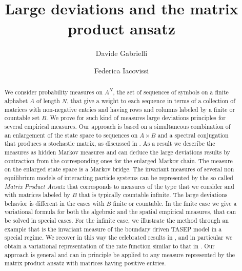 \documentclass[reqno]{amsart}
\theoremstyle{plain}
\theoremstyle{definition}
\theoremstyle{remark}
\numberwithin{equation}{section}
\numberwithin{theorem}{section}
\newcommand{\<}{\langle}
\renewcommand{\>}{\rangle}
\begin{document}
	
	\title[LD and MPA]{Large deviations and the matrix product ansatz}
	
	
	
	
	
	
	
	\author{Davide Gabrielli}
	\address{\noindent Davide Gabrielli \hfill\break\indent 
		DISIM, Universit\`a dell'Aquila
		\hfill\break{} Coppito, L'Aquila, Italy
	}
	
	
	\author{Federica Iacovissi}
	\address{\noindent Federica Iacovissi \hfill\break\indent 
		DISIM, Universit\`a dell'Aquila
		\hfill\break{} Coppito, L'Aquila, Italy
	}
	
	
	
	
	
	
	
	
	
	
	\begin{abstract}
		We consider probability measures on $A^N$, the set of sequences of symbols on a finite alphabet $A$ of length $N$, that give a weight to each sequence in terms of a collection of matrices with non-negative entries and having rows and columns labeled by a finite or countable set $B$. We prove for such kind of measures large deviations principles for several empirical measures. Our approach is based on a simultaneous combination of an enlargement of the state space to sequences on $A\times B$ and a spectral conjugation that produces a stochastic matrix, as discussed in \cite{GI1}. As a result we describe the measures as hidden Markov measures and can deduce the large deviations results by contraction from the corresponding ones for the enlarged Markov chain. The measure on the enlarged state space is a Markov bridge. The invariant measures of several non equilibrium models of interacting particle systems can be represented by the so called {\it Matrix Product Ansatz} that corresponds to measures of the type that we consider and with matrices labeled by $B$ that is typically countable infinite. The large deviations behavior is different in the cases with $B$ finite or countable. In the finite case we give a variational formula for both the algebraic and the spatial empirical measures, that can be solved in special cases. For the infinite case, we illustrate the method through an example that is the invariant measure of the boundary driven TASEP model in a special regime. We recover in this way the celebrated results in \cite{Der4,Derr7}, and in particular we obtain a variational representation of the rate function similar to that in \cite{Bryc}. Our approach is general and can in principle be applied to any measure represented by the matrix product ansatz with matrices having positive entries.
	\end{abstract}
	
\end{document}
